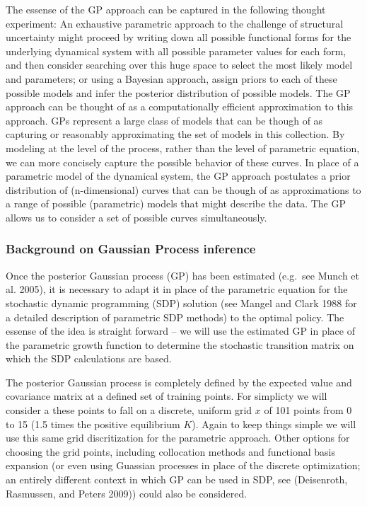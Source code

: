 \documentclass[author-year, review]{elsarticle} %
\begin{document}
The essense of the GP approach can be captured in the following thought
experiment: An exhaustive parametric approach to the challenge of
structural uncertainty might proceed by writing down all possible
functional forms for the underlying dynamical system with all possible
parameter values for each form, and then consider searching over this
huge space to select the most likely model and parameters; or using a
Bayesian approach, assign priors to each of these possible models and
infer the posterior distribution of possible models. The GP approach can
be thought of as a computationally efficient approximation to this
approach. GPs represent a large class of models that can be though of as
capturing or reasonably approximating the set of models in this
collection. By modeling at the level of the process, rather than the
level of parametric equation, we can more concisely capture the possible
behavior of these curves. In place of a parametric model of the
dynamical system, the GP approach postulates a prior distribution of
(n-dimensional) curves that can be though of as approximations to a
range of possible (parametric) models that might describe the data. The
GP allows us to consider a set of possible curves simultaneously.\\

\subsubsection{Background on Gaussian Process inference}

Once the posterior Gaussian process (GP) has been estimated (e.g.~see
Munch et al. 2005), it is necessary to adapt it in place of the
parametric equation for the stochastic dynamic programming (SDP)
solution (see Mangel and Clark 1988 for a detailed description of
parametric SDP methods) to the optimal policy. The essense of the idea
is straight forward -- we will use the estimated GP in place of the
parametric growth function to determine the stochastic transition matrix
on which the SDP calculations are based.

The posterior Gaussian process is completely defined by the expected
value and covariance matrix at a defined set of training points. For
simplicty we will consider a these points to fall on a discrete, uniform
grid $x$ of 101 points from 0 to 15 (1.5 times the positive equilibrium
$K$). Again to keep things simple we will use this same grid
discritization for the parametric approach. Other options for choosing
the grid points, including collocation methods and functional basis
expansion (or even using Guassian processes in place of the discrete
optimization; an entirely different context in which GP can be used in
SDP, see (Deisenroth, Rasmussen, and Peters 2009)) could also be
considered.
\end{document}
